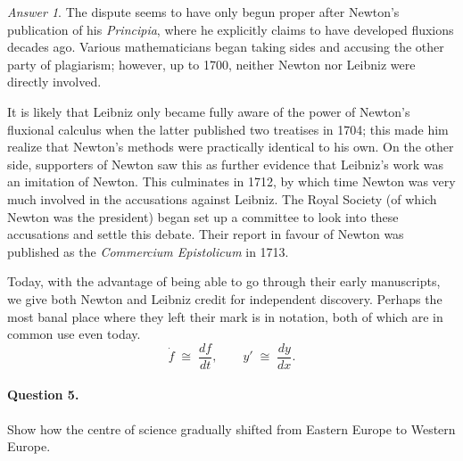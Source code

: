 \documentclass[11pt]{article}
\theoremstyle{remark}
\newtheorem*{answer}{Answer}
\begin{document}
\begin{answer}
        The dispute seems to have only begun proper after Newton's publication of his
        \emph{Principia}, where he explicitly claims to have developed fluxions
        decades ago. Various mathematicians began taking sides and accusing the other
        party of plagiarism; however, up to 1700, neither Newton nor Leibniz were
        directly involved.

        It is likely that Leibniz only became fully aware of the power of Newton's
        fluxional calculus when the latter published two treatises in 1704; this made
        him realize that Newton's methods were practically identical to his own. On
        the other side, supporters of Newton saw this as further evidence that
        Leibniz's work was an imitation of Newton. This culminates in 1712, by which
        time Newton was very much involved in the accusations against Leibniz. The Royal Society
        (of which Newton was the president) began set up a committee to look into
        these accusations and settle this debate. Their report in favour of Newton
        was published as the \emph{Commercium Epistolicum} in 1713.

        Today, with the advantage of being able to go through their early
        manuscripts, we give both Newton and Leibniz credit for independent
        discovery. Perhaps the most banal place where they left their mark is in
        notation, both of which are in common use even today. \[
            \dot{f} \;\cong\; \frac{df}{dt}, \qquad y' \;\cong\; \frac{dy}{dx}.
        \]
    \end{answer}

    \paragraph{Question 5.} Show how the centre of science gradually shifted from
    Eastern Europe to Western Europe.

    
\end{document}
